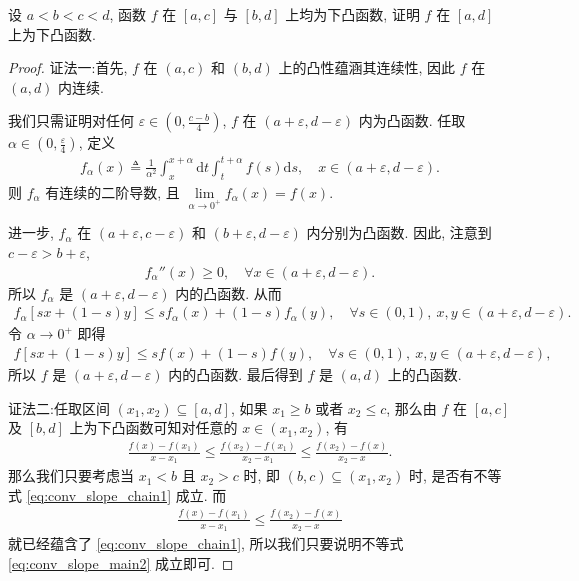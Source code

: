 \documentclass[../../main.tex]{subfiles}%
\begin{document}
\begin{proposition}
设 $a < b < c < d$, 函数 $f$ 在 $[a,c]$ 与 $[b,d]$ 上均为下凸函数, 证明 $f$ 在 $[a,d]$ 上为下凸函数.
\end{proposition}
\begin{proof}

{\color{blue}证法一:}首先, $f$ 在 $(a,c)$ 和 $(b,d)$ 上的凸性蕴涵其连续性, 因此 $f$ 在 $(a,d)$ 内连续.

我们只需证明对任何 $\varepsilon \in \left(0,\frac{c-b}{4}\right)$, $f$ 在 $(a+\varepsilon,d-\varepsilon)$ 内为凸函数. 任取 $\alpha \in \left(0,\frac{\varepsilon}{4}\right)$, 定义
\begin{align*}
f_\alpha(x) \triangleq \frac{1}{\alpha^2} \int_{x}^{x+\alpha} \mathrm{d}t \int_{t}^{t+\alpha} f(s) \mathrm{d}s, \quad x \in (a+\varepsilon,d-\varepsilon).
\end{align*}
则 $f_\alpha$ 有连续的二阶导数, 且 $\lim\limits_{\alpha \to 0^+} f_\alpha(x) = f(x)$.

进一步, $f_\alpha$ 在 $(a+\varepsilon,c-\varepsilon)$ 和 $(b+\varepsilon,d-\varepsilon)$ 内分别为凸函数. 因此, 注意到 $c-\varepsilon > b+\varepsilon$,
\begin{align*}
f_\alpha''(x) \geqslant 0, \quad \forall x \in (a+\varepsilon,d-\varepsilon).
\end{align*}
所以 $f_\alpha$ 是 $(a+\varepsilon,d-\varepsilon)$ 内的凸函数. 从而
\begin{align*}
f_\alpha[sx + (1-s)y] \leqslant s f_\alpha(x) + (1-s) f_\alpha(y), \quad \forall s \in (0,1),\ x,y \in (a+\varepsilon,d-\varepsilon).
\end{align*}
令 $\alpha \to 0^+$ 即得
\begin{align*}
f[sx + (1-s)y] \leqslant s f(x) + (1-s) f(y), \quad \forall s \in (0,1),\ x,y \in (a+\varepsilon,d-\varepsilon),
\end{align*}
所以 $f$ 是 $(a+\varepsilon,d-\varepsilon)$ 内的凸函数. 最后得到 $f$ 是 $(a,d)$ 上的凸函数.

{\color{blue}证法二:}任取区间 $(x_1,x_2) \subseteq [a,d]$, 如果 $x_1 \geqslant b$ 或者 $x_2 \leqslant c$, 那么由 $f$ 在 $[a,c]$ 及 $[b,d]$ 上为下凸函数可知对任意的 $x \in (x_1,x_2)$, 有
\begin{align}
\frac{f(x)-f(x_1)}{x-x_1} \leqslant \frac{f(x_2)-f(x_1)}{x_2-x_1} \leqslant \frac{f(x_2)-f(x)}{x_2-x}.
\label{eq:conv_slope_chain1}
\end{align}
那么我们只要考虑当 $x_1 < b$ 且 $x_2 > c$ 时, 即 $(b,c) \subseteq (x_1,x_2)$ 时, 是否有不等式 \eqref{eq:conv_slope_chain1} 成立. 而
\begin{align}
\frac{f(x)-f(x_1)}{x-x_1} \leqslant \frac{f(x_2)-f(x)}{x_2-x}
\label{eq:conv_slope_main2}
\end{align}
就已经蕴含了 \eqref{eq:conv_slope_chain1}, 所以我们只要说明不等式 \eqref{eq:conv_slope_main2} 成立即可.


\end{proof}
\end{document}
